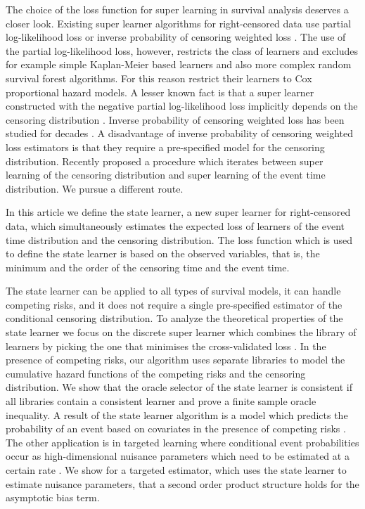 \documentclass[numsec,webpdf,contemporary,medium,namedate]{oup-authoring-template}%
\theoremstyle{thmstyleone}%
\theoremstyle{thmstyletwo}%
\theoremstyle{thmstylethree}%
\newcommand{\1}{\mathds{1}}
\begin{document}
The choice of
the loss function for super learning in survival analysis deserves a
closer look. Existing super learner algorithms for right-censored data
use partial log-likelihood loss or inverse probability of censoring
weighted loss
\citep{polley2011-sl-cens,keles2004asymptotically,golmakani2020super,gonzalez2021stacked,westling2021inference}.
The use of the partial log-likelihood loss, however, restricts the
class of learners and excludes for example simple Kaplan-Meier based
learners and also more complex random survival forest algorithms. For
this reason \cite{golmakani2020super} restrict their learners to Cox
proportional hazard models. A lesser known fact is that a super
learner constructed with the negative partial log-likelihood loss
implicitly depends on the censoring distribution
\citep{hjort1992inference,whitney2019comment}. Inverse probability of
censoring weighted loss has been studied for decades
\citep{graf1999assessment, hothorn2006survival,
  gerds2006consistent}. A disadvantage of inverse probability of
censoring weighted loss estimators is that they require a
pre-specified model for the censoring distribution. Recently
\cite{westling2021inference} proposed a procedure which iterates
between super learning of the censoring distribution and super
learning of the event time distribution. We pursue a
different route.

In this article we define the state learner, a new super learner for
right-censored data, which simultaneously estimates the expected loss of
learners of the event time distribution and the censoring distribution. The loss
function which is used to define the state learner is based on the observed
variables, that is, the minimum and the order of the censoring time and the
event time.

The state learner can be applied to all types of survival models,
it can handle competing risks, and it does not require a
single pre-specified estimator of the conditional censoring
distribution.  To analyze the theoretical properties of the state
learner we focus on the discrete super learner which combines the
library of learners by picking the one that minimises the
cross-validated loss \citep{van2007super}. In the presence of
competing risks, our algorithm uses separate libraries to model the
cumulative hazard functions of the competing risks and the censoring
distribution. We show that the oracle selector of the state learner is
consistent if all libraries contain a consistent learner and prove a
finite sample oracle inequality. A result of the state learner
algorithm is a model which predicts the probability of an event based
on covariates in the presence of competing risks
\citep{gerds2021medical}. The other application is in targeted
learning where conditional event probabilities occur as
high-dimensional nuisance parameters which need to be estimated at a
certain rate \citep{van2011targeted, rytgaard2021estimation,
  rytgaard2022targeted}. We show for a targeted estimator, which uses
the state learner to estimate nuisance parameters, that a second order
product structure holds for the asymptotic bias term.
\end{document}
